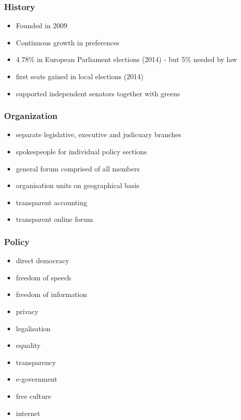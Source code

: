 \begin{frame}
	\frametitle{History}
	\begin{itemize}
		\item Founded in 2009
		\item Continuous growth in preferences 
		\item 4.78\% in European Parliament elections (2014) - but 5\% needed by law
		\item first seats gained in local elections (2014)
		\item supported independent senators together with greens
	\end{itemize}
\end{frame}
\begin{frame}
	\frametitle{Organization}
	\begin{itemize}
		\item separate legislative, executive and judicuary branches
		\item spokespeople for individual policy sections
		\item general forum comprised of all members
		\item organisation units on geographical basis
		\item transparent accounting
		\item transparent online forum
	\end{itemize}
\end{frame}
\begin{frame}
	\frametitle{Policy}
	\begin{itemize}
		\item direct democracy
		\item freedom of speech
		\item freedom of information
		\item privacy
		\item legalisation
		\item equality
		\item transparency
		\item e-government
		\item free culture
		\item internet
	\end{itemize}
\end{frame}
